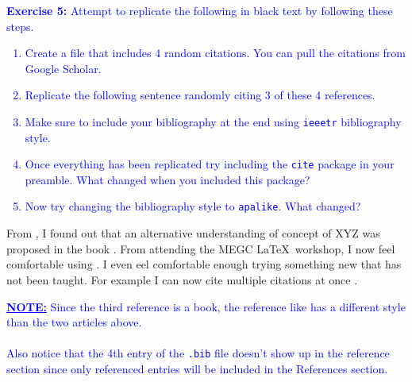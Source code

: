 \documentclass[]{article}
\newcommand{\BlueText}[1]{\textcolor{blue}{#1}}
\begin{document}
\noindent \BlueText{\textbf{Exercise 5:} Attempt to replicate the following in black text by following these steps.} 
\vspace*{0.5cm}

\BlueText{
\begin{enumerate}[label=\textbf{Step \arabic*:}]
	\item Create a \hologo{BibTeX} file that includes 4 random citations.
	You can pull the citations from Google Scholar.
	\item Replicate the following sentence randomly citing 3 of these 4 references.
	\item Make sure to include your bibliography at the end using \texttt{ieeetr} bibliography style.
	\item Once everything has been replicated try including the \texttt{cite} package in your preamble.
	What changed when you included this package?
	\item Now try changing the bibliography style to \texttt{apalike}.
	What changed?
\end{enumerate}
}

From \cite{phillips2006invasion}, I found out that an alternative understanding of concept of XYZ \cite{davies1978deep} was proposed in the book \cite{mattison1987frogs}.
From attending the MEGC \LaTeX\ workshop, I now feel comfortable using .
I even eel comfortable enough trying something new that has not been taught.
For example I can now cite multiple citations at once \cite{phillips2006invasion, davies1978deep, mattison1987frogs}.

\vspace{1cm}




\noindent \BlueText{\textbf{\underline{NOTE:}} Since the third reference is a book, the reference like has a different style than the two articles above.\\\\
Also notice that the 4th entry of the \texttt{.bib} file doesn't show up in the reference section since only referenced entries will be included in the References section.}
\end{document}
